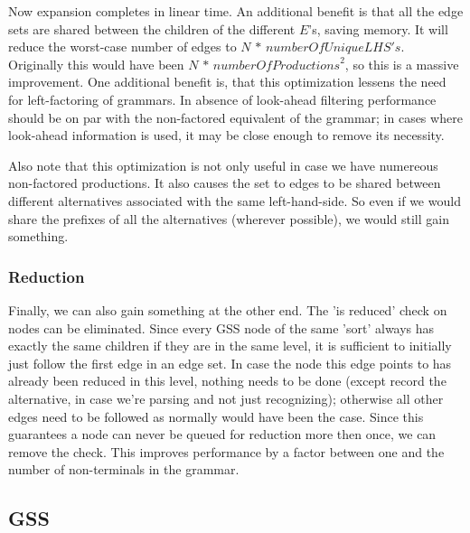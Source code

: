 \documentclass[a4paper,10pt]{article}
\begin{document}
Now expansion completes in linear time. An additional benefit is that all the edge sets are shared between the children of the different $E$'s, saving memory. It will reduce the worst-case number of edges to $N\,*\,\mathit{numberOfUniqueLHS's}$. Originally this would have been $N\,*\,\mathit{numberOfProductions}^2$, so this is a massive improvement. One additional benefit is, that this optimization lessens the need for left-factoring of grammars. In absence of look-ahead filtering performance should be on par with the non-factored equivalent of the grammar; in cases where look-ahead information is used, it may be close enough to remove its necessity.

Also note that this optimization is not only useful in case we have numereous non-factored productions. It also causes the set to edges to be shared between different alternatives associated with the same left-hand-side. So even if we would share the prefixes of all the alternatives (wherever possible), we would still gain something.

\subsubsection{Reduction}
Finally, we can also gain something at the other end. The 'is reduced' check on nodes can be eliminated. Since every GSS node of the same 'sort' always has exactly the same children if they are in the same level, it is sufficient to initially just follow the first edge in an edge set. In case the node this edge points to has already been reduced in this level, nothing needs to be done (except record the alternative, in case we're parsing and not just recognizing); otherwise all other edges need to be followed as normally would have been the case. Since this guarantees a node can never be queued for reduction more then once, we can remove the check. This improves performance by a factor between one and the number of non-terminals in the grammar.

\subsection{GSS}
\end{document}
